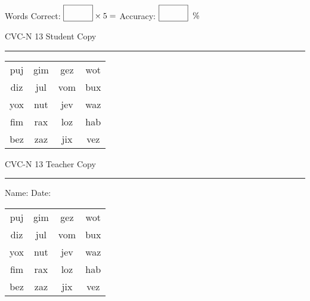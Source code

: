 \documentclass{memoir}
\begin{document}
\small

Words Correct: $\fbox{\phantom{\huge 100}} \times 5 = $ Accuracy: $\fbox{\phantom{\huge 100}}\;\; \%$ 

\vfill

\newpage


\footnotesize \noindent
CVC-N 13 \hfill Student Copy
\smallskip
\hrule

\Large

\setlength{\tabcolsep}{14pt}
\def\arraystretch{2}

{\selectfont


\begin{vplace}[0.5]
\begin{center}
\begin{tabular}{cccc}
puj & gim & gez & wot \\
diz & jul & vom & bux \\
yox & nut & jev & waz \\
fim & rax & loz & hab \\
bez & zaz & jix & vez \\
\end{tabular}
\end{center}
\end{vplace}

}

\newpage

\footnotesize \noindent
CVC-N 13 \hfill Teacher Copy
\smallskip
\hrule

\small

\vfill

\noindent
Name: \underline{\hspace{1.75in}} \hfill Date: \underline{\hspace{1in}}

\Large

{\selectfont


\begin{vplace}[0.5]
\begin{center}
\begin{tabular}{cccc}
puj & gim & gez & wot \\
diz & jul & vom & bux \\
yox & nut & jev & waz \\
fim & rax & loz & hab \\
bez & zaz & jix & vez \\
\end{tabular}
\end{center}
\end{vplace}



}
\end{document}
